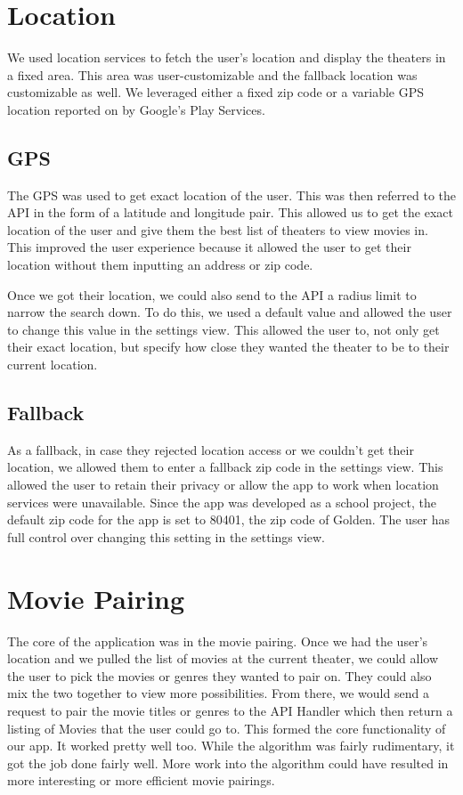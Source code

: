 \documentclass{article}
\begin{document}
    \section*{Location}
    We used location services to fetch the user's location and display the theaters in a fixed area.
    This area was user-customizable and the fallback location was customizable as well. We leveraged either
    a fixed zip code or a variable GPS location reported on by Google's Play Services.
    \subsection*{GPS}
    The GPS was used to get exact location of the user. This was then referred to the API in the form of a
    latitude and longitude pair. This allowed us to get the exact location of the user and give them the
    best list of theaters to view movies in. This improved the user experience because it allowed the user
    to get their location without them inputting an address or zip code.

    Once we got their location, we could also send to the API a radius limit to narrow the search
    down. To do this, we used a default value and allowed the user to change this value in the settings view.
    This allowed the user to, not only get their exact location, but specify how close they wanted the theater
    to be to their current location.
    \subsection*{Fallback}
    As a fallback, in case they rejected location access or we couldn't get their location, we allowed them
    to enter a fallback zip code in the settings view. This allowed the user to retain their privacy or
    allow the app to work when location services were unavailable. Since the app was developed as a school
    project, the default zip code for the app is set to 80401, the zip code of Golden. The user has full control
    over changing this setting in the settings view.
    \section*{Movie Pairing}
    The core of the application was in the movie pairing. Once we had the user's location and we pulled the
    list of movies at the current theater, we could allow the user to pick the movies or genres they wanted
    to pair on. They could also mix the two together to view more possibilities. From there, we would send
    a request to pair the movie titles or genres to the API Handler which then return a listing of Movies
    that the user could go to. This formed the core functionality of our app. It worked pretty well too.
    While the algorithm was fairly rudimentary, it got the job done fairly well. More work into the algorithm
    could have resulted in more interesting or more efficient movie pairings.
\end{document}
